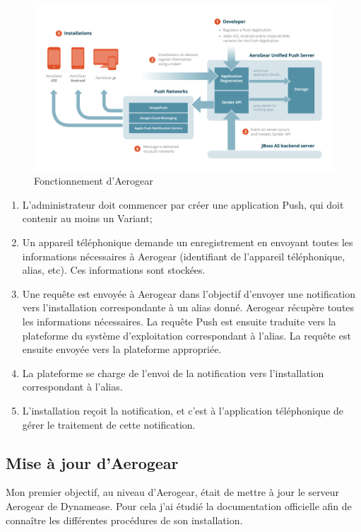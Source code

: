 \begin{figure}[!h]
	\includegraphics[scale=0.6]{img/aerogear_unified_push_server.png}
	\caption{\label{aerogear} Fonctionnement d'Aerogear}
\end{figure}


\begin{enumerate}
	\item L'administrateur doit commencer par créer une application Push, qui doit contenir au moins un Variant;
	\item Un appareil téléphonique demande un enregistrement en envoyant toutes les informations nécessaires à Aerogear (identifiant de l'appareil téléphonique, alias, etc). Ces informations sont stockées.
	\item Une requête est envoyée à Aerogear dans l'objectif d'envoyer une notification vers l'installation correspondante à un alias donné. Aerogear récupère toutes les informations nécessaires. La requête Push est ensuite traduite vers la plateforme du système d'exploitation correspondant à l'alias. La requête est ensuite envoyée vers la plateforme appropriée.
	\item La plateforme se charge de l'envoi de la notification vers l'installation correspondant à l'alias.
	\item L'installation reçoit la notification, et c'est à l'application téléphonique de gérer le traitement de cette notification.
\end{enumerate}

\subsection{Mise à jour d'Aerogear}

Mon premier objectif, au niveau d'Aerogear, était de mettre à jour le serveur Aerogear de Dynamease. Pour cela j'ai étudié la documentation officielle afin de connaître les différentes procédures de son installation.

